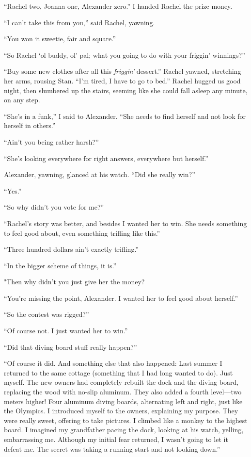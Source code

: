 ``Rachel two, Joanna one, Alexander zero.'' I handed Rachel the prize
money.

``I can't take this from you,'' said Rachel, yawning.

``You won it sweetie, fair and square.''

``So Rachel `ol buddy, ol' pal; what you going to do with your friggin'
winnings?''

``Buy some new clothes after all this \emph{friggin'} dessert.'' Rachel
yawned, stretching her arms, rousing Stan. ``I'm tired, I have to go to
bed.'' Rachel hugged us good night, then slumbered up the stairs,
seeming like she could fall asleep any minute, on any step.

``She's in a funk,'' I said to Alexander. ``She needs to find herself
and not look for herself in others.''

``Ain't you being rather harsh?''

``She's looking everywhere for right answers, everywhere but herself.''

Alexander, yawning, glanced at his watch. ``Did she really win?''

``Yes.''

``So why didn't you vote for me?''

``Rachel's story was better, and besides I wanted her to win. She needs
something to feel good about, even something trifling like this.''

``Three hundred dollars ain't exactly trifling.''

``In the bigger scheme of things, it is.''

"Then why didn't you just give her the money?

``You're missing the point, Alexander. I wanted her to feel good about
herself.''

``So the contest was rigged?''

``Of course not. I just wanted her to win.''

``Did that diving board stuff really happen?''

``Of course it did. And something else that also happened: Last summer I
returned to the same cottage (something that I had long wanted to do).
Just myself. The new owners had completely rebuilt the dock and the
diving board, replacing the wood with no-slip aluminum. They also added
a fourth level---two meters higher! Four aluminum diving boards,
alternating left and right, just like the Olympics. I introduced myself
to the owners, explaining my purpose. They were really sweet, offering
to take pictures. I climbed like a monkey to the highest board. I
imagined my grandfather pacing the dock, looking at his watch, yelling,
embarrassing me. Although my initial fear returned, I wasn't going to
let it defeat me. The secret was taking a running start and not looking
down.''

